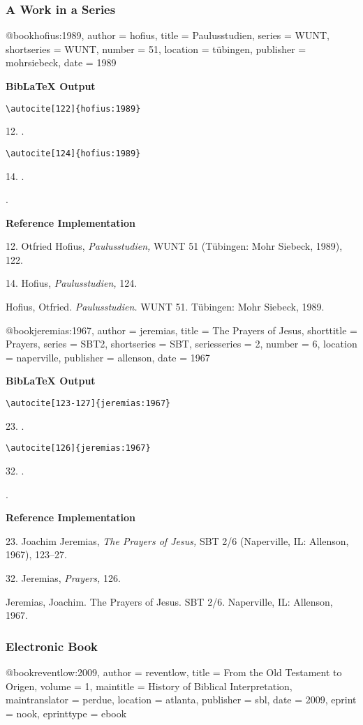 \documentclass[a4paper]{article}
\newcommand\citetest[5]{%
  {\textbf{BibLaTeX Output}\par
   \nobreak
   \texttt{\textbackslash autocite[#2]\{#5\}}\par
   \color{biblatex-colour}
   #1. \cite[#2]{#5}.\par
   \color{black}
   \texttt{\textbackslash autocite[#4]\{#5\}}\par
   \color{biblatex-colour}
   #3. \cite[#4]{#5}.\par
   \hangindent\bibindent\bibentrycite{#5}.\par}}
\newenvironment{refimp}{%
  \begin{minipage}{\linewidth}
    \setlength{\parskip}{1ex}
    \textbf{Reference Implementation}\par
    \nobreak
    \color{reference-colour}
}{\end{minipage}}
\newenvironment{vb}{%
  \setlength{\parskip}{0pt}
  \verbatim}{\endverbatim}
\begin{document}
\subsubsection{A Work in a Series}

\begin{vb}
@book{hofius:1989,
  author = hofius,
  title = {Paulusstudien},
  series = WUNT,
  shortseries = {WUNT},
  number = {51},
  location = tübingen,
  publisher = mohrsiebeck,
  date = {1989}
}
\end{vb}  

\citetest{12}{122}{14}{124}{hofius:1989}

\begin{refimp}
  12. Otfried Hofius, \emph{Paulusstudien,} WUNT 51 (Tübingen: Mohr Siebeck,
  1989), 122.

  14. Hofius, \emph{Paulusstudien,} 124.

  Hofius, Otfried. \emph{Paulusstudien.} WUNT 51. Tübingen: Mohr Siebeck,
  1989.
\end{refimp}

\begin{vb}
@book{jeremias:1967,
  author = jeremias,
  title = {The Prayers of Jesus},
  shorttitle = {Prayers},
  series = SBT2,
  shortseries = {SBT},
  seriesseries = {2},
  number = {6},
  location = naperville,
  publisher = allenson,
  date = {1967}
}
\end{vb}

\citetest{23}{123-127}{32}{126}{jeremias:1967}

\begin{refimp}
  23. Joachim Jeremias, \emph{The Prayers of Jesus,} SBT 2/6 (Naperville, IL:
  Allenson, 1967), 123–27.

  32. Jeremias, \emph{Prayers,} 126.

  \hangindent\bibindent Jeremias, Joachim. The Prayers of Jesus. SBT 2/6.
  Naperville, IL: Allenson, 1967.
\end{refimp}

\subsubsection{Electronic Book}

\begin{vb}
@book{reventlow:2009,
  author = reventlow,
  title = {From the Old Testament to Origen},
  volume = {1},
  maintitle = {History of Biblical Interpretation},
  maintranslator = perdue,
  location = atlanta,
  publisher = sbl,
  date = 2009,
  eprint = nook,
  eprinttype = {ebook}
}
\end{vb}
\end{document}
